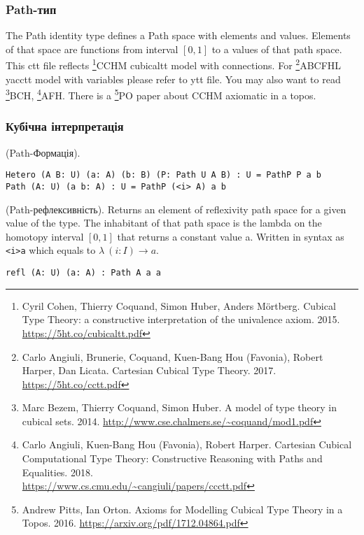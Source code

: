\newpage
\subsubsection{Path-тип}
The Path identity type defines a Path space with elements and values.
Elements of that space are functions from interval $[0,1]$ to a values of that path space.
This ctt file reflects \footnote{Cyril Cohen, Thierry Coquand, Simon Huber, Anders M{\"{o}}rtberg. Cubical Type Theory: a constructive interpretation of the univalence axiom. 2015. \url{https://5ht.co/cubicaltt.pdf}}{CCHM} cubicaltt model with connections.
For \footnote{Carlo Angiuli, Brunerie, Coquand, Kuen-Bang Hou (Favonia), Robert Harper, Dan Licata. Cartesian Cubical Type Theory. 2017. \url{https://5ht.co/cctt.pdf}}{ABCFHL} yacctt model with
variables please refer to ytt file. You may also want to
read \footnote{Marc Bezem, Thierry Coquand, Simon Huber. A model of type theory in cubical sets. 2014. \url{http://www.cse.chalmers.se/~coquand/mod1.pdf}}{BCH},
\footnote{Carlo Angiuli, Kuen-Bang Hou (Favonia), Robert Harper. Cartesian Cubical Computational Type Theory: Constructive Reasoning with Paths and Equalities. 2018. \\ \url{https://www.cs.cmu.edu/~cangiuli/papers/ccctt.pdf}}{AFH}.
There is a \footnote{Andrew Pitts, Ian Orton. Axioms for Modelling Cubical Type Theory in a Topos. 2016. \url{https://arxiv.org/pdf/1712.04864.pdf}}{PO} paper about CCHM axiomatic in a topos.

\subsubsection{Кубічна інтерпретація}

\begin{definition} (Path-Формація).
\begin{lstlisting}
Hetero (A B: U) (a: A) (b: B) (P: Path U A B) : U = PathP P a b
Path (A: U) (a b: A) : U = PathP (<i> A) a b
\end{lstlisting}
\end{definition}

\begin{definition} (Path-рефлексивність).
Returns an element of reflexivity path space for a given value of the type.
The inhabitant of that path space is the lambda on the homotopy
interval $[0,1]$ that returns a constant value a. Written in
syntax as \lstinline{<i>a} which equals to $\lambda\ (i: I) \rightarrow a$.
\begin{lstlisting}
refl (A: U) (a: A) : Path A a a
\end{lstlisting}
\end{definition}

